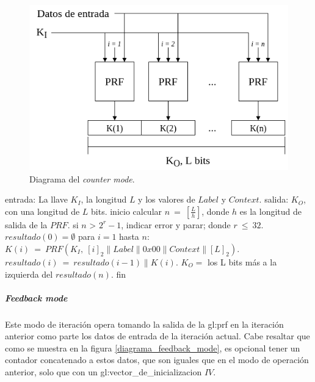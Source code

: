 \begin{figure}
  \begin{center}
    \includegraphics[width=0.75\linewidth]{diagramas/counter_mode}
    \caption{Diagrama del \textit{counter mode}.}
    \label{diagrama_counter_mode}
   \end{center}
\end{figure}

\begin{pseudocodigo}[caption={Funcionamiento del \textit{counter mode}.},
label={mi:1}]
    entrada:   La llave $K_I$, la longitud $L$ y los valores de $Label$ y $Context$.
    salida:    $K_O$, con una longitud de $L$ bits.
    inicio
      calcular $n\: =\: [\frac{L}{h}]$, donde $h$ es la longitud de salida de la $PRF$.
      si $n$ > $2^r-1$, indicar error y parar; donde $r\: \leq\: 32$.
      $resultado(0) = \emptyset$
      para $i=1$ hasta $n$:
        $K(i)\: =\: PRF(K_I,\: {[i]}_2 \parallel Label \parallel 0x00 \parallel Context \parallel {[L]}_2 )$.
        $resultado(i)\: =\: resultado(i-1) \parallel K(i)$.
      $K_O =$ los L bits más a la izquierda del $resultado(n)$.
    fin
\end{pseudocodigo}

\subparagraph{Feedback mode}
Este modo de iteración opera tomando la salida de la \gls{gl:prf} en la
iteración anterior como parte los datos de entrada de la iteración actual.
Cabe resaltar que como se muestra en la figura \ref{diagrama_feedback_mode},
es opcional tener un contador concatenado a estos datos, que son iguales que
en el modo de operación anterior, solo que con un
\gls{gl:vector_de_inicializacion} $IV$.

